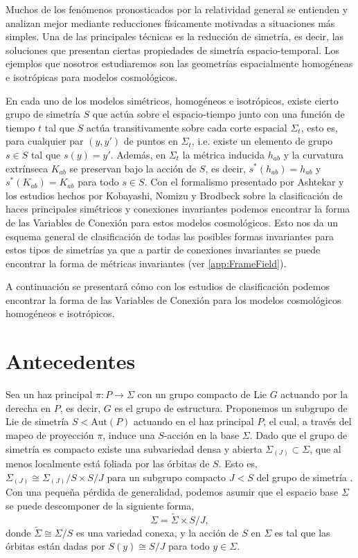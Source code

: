 Muchos de los fen\'{o}menos pronosticados por la relatividad general se entienden y analizan mejor mediante reducciones f\'{i}sicamente motivadas a situaciones m\'{a}s simples. Una de las principales t\'{e}cnicas es la reducci\'{o}n de simetr\'{i}a, es decir, las soluciones que presentan ciertas propiedades de simetr\'{i}a espacio-temporal. Los ejemplos que nosotros estudiaremos son las geometr\'{i}as espacialmente homog\'{e}neas e isotr\'{o}picas para modelos cosmol\'{o}gicos.

En cada uno de los modelos sim\'{e}tricos, homog\'{e}neos e isotr\'{o}picos, existe cierto grupo de simetr\'{i}a $S$ que act\'{u}a sobre el espacio-tiempo junto con una funci\'{o}n de tiempo $t$ tal que $S$ act\'{u}a transitivamente sobre cada corte espacial $\Sigma_{t}$, esto es, para cualquier par $(y, y')$ de puntos en $\Sigma_{t}$, i.e. existe un elemento de grupo $s \in S$ tal que $s(y) = y'$. Adem\'{a}s, en $\Sigma_{t}$  la m\'{e}trica inducida $h_{ab}$ y la curvatura extr\'{i}nseca $K_{ab}$ se preservan bajo la acci\'{o}n de $S$, es decir, $s^{*}(h_{ab}) = h_{ab}$ y $s^{*}(K_{ab}) = K_{ab}$ para todo $s \in S$. Con el formalismo presentado por Ashtekar \cite{Ashtekar86, Ashtekar87} y los estudios hechos por Kobayashi, Nomizu y Brodbeck sobre la clasificaci\'{o}n de haces principales sim\'{e}tricos y conexiones invariantes \cite{Kobayashi, Brodbeck} podemos encontrar la forma de las Variables de Conexi\'{o}n para estos modelos cosmol\'{o}gicos. Esto nos da un esquema general de clasificaci\'{o}n de todas las posibles formas invariantes para estos tipos de simetr\'{i}as ya que a partir de conexiones invariantes se puede encontrar la forma de m\'{e}tricas invariantes (ver \autoref{app:FrameField}).

A continuaci\'{o}n se presentar\'{a} c\'{o}mo con los estudios de clasificaci\'{o}n podemos encontrar la forma de las Variables de Conexi\'{o}n para los modelos cosmol\'{o}gicos homog\'{e}neos e isotr\'{o}picos.

\section{Antecedentes}

Sea un haz principal $\pi: P \longrightarrow \Sigma$ con un grupo compacto de Lie $G$ actuando por la derecha en $P$, es decir, $G$ es el grupo de estructura. Proponemos un subgrupo de Lie de simetr\'{i}a $S < \mathrm{Aut}(P)$ actuando en el haz principal $P$, el cual, a trav\'{e}s del mapeo de proyecci\'{o}n $\pi$, induce una $S$-acci\'{o}n en la base $\Sigma$. Dado que el grupo de simetr\'{i}a es compacto existe una subvariedad densa y abierta $\Sigma_{(J)} \subset \Sigma$, que al menos localmente est\'{a} foliada por las \'{o}rbitas de $S$. Esto es, $\Sigma_{(J)} \cong  \Sigma_{(J)}/S \times S/J$ para un subgrupo compacto $J < S$ del grupo de simetr\'{i}a \cite{Dieck}. Con una peque\~{n}a p\'{e}rdida de generalidad, podemos asumir que el espacio base $\Sigma$ se puede descomponer de la siguiente forma, $$\Sigma = \tilde{\Sigma} \times S/J,$$ donde $\tilde{\Sigma} \cong \Sigma/S$ es una variedad conexa, y la acci\'{o}n de $S$ en $\Sigma$ es tal que las \'{o}rbitas est\'{a}n dadas por $S(y) \cong S/J$ para todo $y \in \Sigma$.

